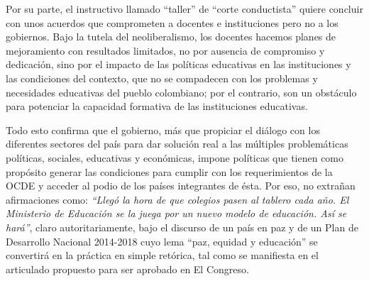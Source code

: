 \documentclass[10pt]{article}
\begin{document}
Por su parte, el instructivo llamado “taller” de “corte conductista” quiere concluir con unos acuerdos que comprometen a docentes e instituciones pero no a los gobiernos. Bajo la
tutela del neoliberalismo, los docentes hacemos planes de mejoramiento con resultados limitados, no por ausencia de compromiso y dedicación, sino por el impacto de las políticas
educativas en las instituciones y las condiciones del contexto, que no se compadecen con los problemas y necesidades educativas del pueblo colombiano; por el contrario, son un obstáculo para potenciar la capacidad formativa de las instituciones educativas.

Todo esto confirma que el gobierno, más que propiciar el diálogo con los diferentes sectores del país para dar solución real a las múltiples problemáticas políticas, sociales,
educativas y económicas, impone políticas que tienen como propósito generar las condiciones para cumplir con los requerimientos de la OCDE y acceder al podio de los
países integrantes de ésta. Por eso, no extrañan afirmaciones como: \emph{“Llegó la hora de que colegios pasen al tablero cada año. El Ministerio de Educación se la juega por un nuevo modelo de educación. Así se hará”}, claro autoritariamente, bajo el discurso de un país en paz y de un Plan de Desarrollo Nacional 2014-2018 cuyo lema “paz, equidad y educación” se convertirá en la práctica en simple retórica, tal como se manifiesta en el articulado propuesto para ser aprobado en El Congreso.
\end{document}
